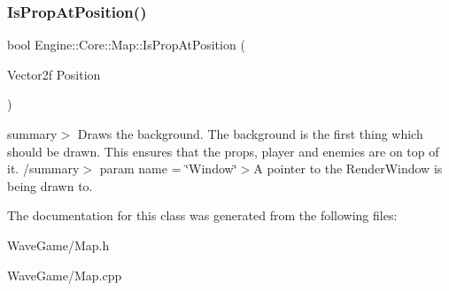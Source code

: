 \subsubsection{\texorpdfstring{Is\+Prop\+At\+Position()}{IsPropAtPosition()}}
{\footnotesize\ttfamily bool Engine\+::\+Core\+::\+Map\+::\+Is\+Prop\+At\+Position (\begin{DoxyParamCaption}\item[{Vector2f}]{Position }\end{DoxyParamCaption})}

summary$>$ Draws the background. The background is the first thing which should be drawn. This ensures that the props, player and enemies are on top of it. /summary$>$ param name = \char`\"{}\+Window\char`\"{}$>$A pointer to the Render\+Window is being drawn to.

The documentation for this class was generated from the following files\+:\begin{DoxyCompactItemize}
\item 
Wave\+Game/Map.\+h\item 
Wave\+Game/Map.\+cpp\end{DoxyCompactItemize}
